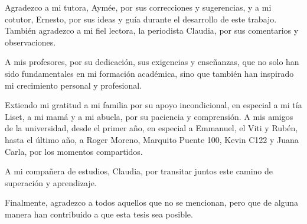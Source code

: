 \begin{acknowledgements}
    Agradezco a mi tutora, Aymée, por sus correcciones y sugerencias, 
    y a mi cotutor, Ernesto, por sus ideas y guía durante el desarrollo 
    de este trabajo. También agradezco a mi fiel lectora, la 
    periodista Claudia, por sus comentarios y observaciones.

    A mis profesores, por su dedicación, sus exigencias y enseñanzas,
     que no solo han sido fundamentales en mi formación académica, 
     sino que también han inspirado mi crecimiento personal y 
     profesional. 

Extiendo mi gratitud a mi familia por su apoyo incondicional, en 
especial a mi tía Liset, a mi mamá y a mi abuela, por su paciencia y 
comprensión. A mis amigos de la universidad, desde el primer año, 
en especial a Emmanuel, el Viti y Rubén, hasta el último año, a 
Roger Moreno, Marquito Puente 100, Kevin C122 y Juana Carla, 
por los momentos compartidos.

A mi compañera de estudios, Claudia, por transitar juntos este camino 
de superación y aprendizaje. 

Finalmente, agradezco a todos aquellos que 
no se mencionan, pero que de alguna manera han contribuido a que esta 
tesis sea posible.

\end{acknowledgements}